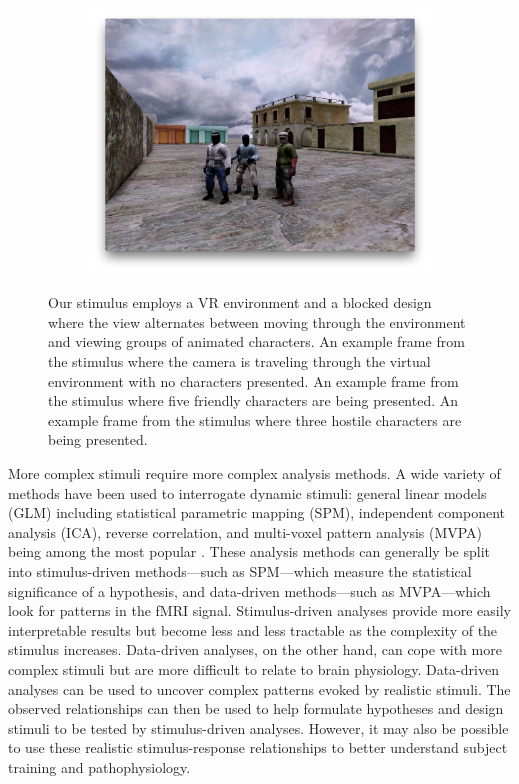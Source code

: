 \documentclass[review,1p,authoryear]{elsarticle}
\begin{document}
\begin{figure}
\begin{subfigure}{0.3\textwidth}
\includegraphics[width=\textwidth]{figures/stimulus-three-insurgents}
\caption{}
\label{fig:stimulus-three-insurgents}
\end{subfigure}
\caption{
Our stimulus employs a VR environment and a blocked design where the view alternates between moving through the environment and viewing groups of animated characters.
 An example frame from the stimulus where the camera is traveling through the virtual environment with no characters presented.
 An example frame from the stimulus where five friendly characters are being presented.
 An example frame from the stimulus where three hostile characters are being presented.}
\label{fig:stimulus}
\end{figure}

More complex stimuli require more complex analysis methods.
A wide variety of methods have been used to interrogate dynamic stimuli: general linear models (GLM) including statistical parametric mapping (SPM), independent component analysis (ICA), reverse correlation, and multi-voxel pattern analysis (MVPA) being among the most popular \citep{Spiers2007}.
These analysis methods can generally be split into stimulus-driven methods---such as SPM---which measure the statistical significance of a hypothesis, and data-driven methods---such as MVPA---which look for patterns in the fMRI signal.
Stimulus-driven analyses provide more easily interpretable results but become less and less tractable as the complexity of the stimulus increases.
Data-driven analyses, on the other hand, can cope with more complex stimuli but are more difficult to relate to brain physiology.
Data-driven analyses can be used to uncover complex patterns evoked by realistic stimuli. The observed relationships can then be used to help formulate hypotheses and design stimuli to be tested by stimulus-driven analyses. 
However, it may also be possible to use these realistic stimulus-response relationships to better understand subject training and pathophysiology.
\end{document}
